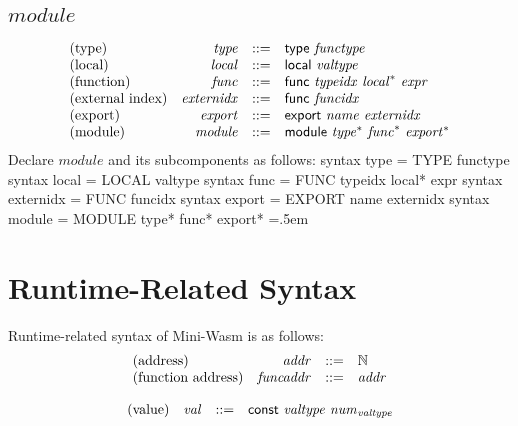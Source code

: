 \documentclass{article}
\newenvironment{lcverbatim}
 {\SaveVerbatim{cverb}}
 {\endSaveVerbatim
  \flushleft\fboxrule=0pt\fboxsep=.5em
  \colorbox{cverbbg}{%
    \makebox[\dimexpr\linewidth-2\fboxsep][l]{\BUseVerbatim{cverb}}%
  }
  \endflushleft
}
\begin{document}
\subsection{$module$}
$$
\begin{array}{@{}lrrl@{}l@{}}
	\mbox{(type)} & {\mathit{type}} &::=& \mathsf{type}~{\mathit{functype}} \\
	\mbox{(local)} & {\mathit{local}} &::=& \mathsf{local}~{\mathit{valtype}} \\
	\mbox{(function)} & {\mathit{func}} &::=& \mathsf{func}~{\mathit{typeidx}}~{{\mathit{local}}^\ast}~{\mathit{expr}} \\
	\mbox{(external index)} & {\mathit{externidx}} &::=& \mathsf{func}~{\mathit{funcidx}} \\
	\mbox{(export)} & {\mathit{export}} &::=& \mathsf{export}~{\mathit{name}}~{\mathit{externidx}} \\
	\mbox{(module)} & {\mathit{module}} &::=& \mathsf{module}~{{\mathit{type}}^\ast}~{{\mathit{func}}^\ast}~{{\mathit{export}}^\ast} \\
\end{array}
$$
Declare $module$ and its subcomponents as follows:
\begin{lcverbatim}
syntax type = TYPE functype
syntax local = LOCAL valtype
syntax func = FUNC typeidx local* expr
syntax externidx = FUNC funcidx
syntax export = EXPORT name externidx
syntax module = MODULE type* func* export*
\end{lcverbatim}

\section{Runtime-Related Syntax}
Runtime-related syntax of Mini-Wasm is as follows:
$$
\begin{array}{@{}lrrl@{}l@{}}
	\mbox{(address)} & {\mathit{addr}} &::=& \mathbb{N} \\
	\mbox{(function address)} & {\mathit{funcaddr}} &::=& {\mathit{addr}} \\
\end{array}
$$

\vspace{1ex}

\vspace{1ex}

$$
\begin{array}{@{}lrrl@{}l@{}}
	\mbox{(value)} & {\mathit{val}} &::=& \mathsf{const}~{\mathit{valtype}}~{{\mathit{num}}}_{{\mathit{valtype}}} \\
\end{array}
$$
\end{document}
